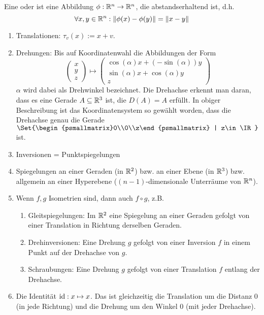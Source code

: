 \begin{definition}
Eine  oder  ist eine Abbildung $\phi:\mathbb{R}^n\to\mathbb{R}^n$, die abstandserhaltend ist, d.h.
\[\forall x,y\in\mathbb{R}^n: \lVert\phi(x)-\phi(y)\rVert = \lVert x-y\rVert\]
\end{definition}

\begin{example}
\begin{enumerate}
\item Translationen: $\tau_v(x) := x+v$.
\item Drehungen: Bis auf Koordinatenwahl die Abbildungen der Form
\[\begin{pmatrix}x\\y\\z\end{pmatrix}\mapsto\begin{pmatrix}
\cos(\alpha)x + (-\sin(\alpha)) y \\
\sin(\alpha)x + \cos(\alpha)y \\
z
\end{pmatrix}\]
$\alpha$ wird dabei als Drehwinkel bezeichnet. Die Drehachse erkennt man daran, dass es eine Gerade $A\subseteq\mathbb{R}^3$ ist, die $D(A)=A$ erfüllt. In obiger Beschreibung ist das Koordinatensystem so gewählt worden, dass die Drehachse genau die Gerade $\Set{\begin{psmallmatrix}0\\0\\z\end{psmallmatrix} | z\in\IR}$ ist.
\item Inversionen = Punktspiegelungen
\item Spiegelungen an einer Geraden (in $\mathbb{R}^2$) bzw. an einer Ebene (in $\mathbb{R}^3$) bzw. allgemein an einer Hyperebene ($(n-1)$-dimensionale Unterräume von $\mathbb{R}^n$).
\item Wenn $f,g$ Isometrien sind, dann auch $f\circ g$, z.B.
\begin{enumerate}
\item Gleitspiegelungen: Im $\mathbb{R}^2$ eine Spiegelung an einer Geraden gefolgt von einer Translation in Richtung derselben Geraden.
\item Drehinversionen: Eine Drehung $g$ gefolgt von einer Inversion $f$ in einem Punkt auf der Drehachse von $g$.
\item Schraubungen: Eine Drehung $g$ gefolgt von einer Translation $f$ entlang der Drehachse.
\end{enumerate}
\item Die Identität $\operatorname{id}: x\mapsto x$. Das ist gleichzeitig die Translation um die Distanz $0$ (in jede Richtung) und die Drehung um den Winkel $0$ (mit jeder Drehachse).
\end{enumerate}
\end{example}

